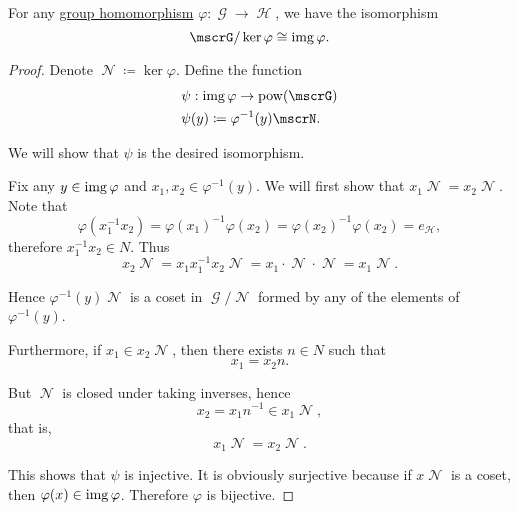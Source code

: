 \begin{theorem}\label{thm:homomorphism_theorem_for_groups}
  For any \hyperref[def:group/homomorphism]{group homomorphism} \( \varphi: \mscrG \to \mscrH \), we have the isomorphism
  \begin{equation*}
    \mscrG / \ker \varphi \cong \img \varphi.
  \end{equation*}
\end{theorem}
\begin{proof}
  Denote \( \mscrN \coloneqq \ker \varphi \). Define the function
  \begin{align*}
    &\psi: \img \varphi \to \pow(\mscrG) \\
    &\psi(y) \coloneqq \varphi^{-1}(y) \mscrN.
  \end{align*}

  We will show that \( \psi \) is the desired isomorphism.

  Fix any \( y \in \operatorname{img} \varphi \) and \( x_1, x_2 \in \varphi^{-1}(y) \). We will first show that \( x_1 \mscrN = x_2 \mscrN \). Note that
  \begin{equation*}
    \varphi(x_1^{-1} x_2)
    =
    \varphi(x_1)^{-1} \varphi(x_2)
    =
    \varphi(x_2)^{-1} \varphi(x_2)
    =
    e_{\mscrH},
  \end{equation*}
  therefore \( x_1^{-1} x_2 \in N \). Thus
  \begin{equation*}
    x_2 \mscrN = x_1 x_1^{-1} x_2 \mscrN = x_1 \cdot \mscrN \cdot \mscrN = x_1 \mscrN.
  \end{equation*}

  Hence \( \varphi^{-1}(y) \mscrN \) is a coset in \( \mscrG / \mscrN \) formed by any of the elements of \( \varphi^{-1}(y) \).

  Furthermore, if \( x_1 \in x_2 \mscrN \), then there exists \( n \in N \) such that
  \begin{equation*}
    x_1 = x_2 n.
  \end{equation*}

  But \( \mscrN \) is closed under taking inverses, hence
  \begin{equation*}
    x_2 = x_1 n^{-1} \in x_1 \mscrN,
  \end{equation*}
  that is,
  \begin{equation*}
    x_1 \mscrN = x_2 \mscrN.
  \end{equation*}

  This shows that \( \psi \) is injective. It is obviously surjective because if \( x \mscrN \) is a coset, then \( \varphi(x) \in \operatorname{img} \varphi \). Therefore \( \varphi \) is bijective.


\end{proof}

